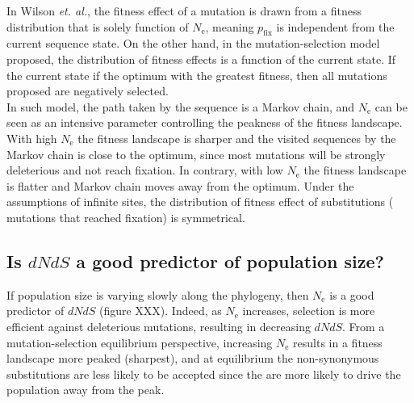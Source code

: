 \documentclass{article}
\newcommand{\e}{\mathrm{e}}
\newcommand{\Ne}{N_\e}
\newcommand{\dnds}{dNdS}
\begin{document}
In Wilson \textit{et. al.}, the fitness effect of a mutation is drawn from a fitness distribution that is solely function of $\Ne$, meaning ${p_{\mathrm{fix}}}$ is independent from the current sequence state.
On the other hand, in the mutation-selection model proposed, the distribution of fitness effects is a function of the current state.
If the current state if the optimum with the greatest fitness, then all mutations proposed are negatively selected.\\

In such model, the path taken by the sequence is a Markov chain, and $\Ne$ can be seen as an intensive parameter controlling the peakness of the fitness landscape. With high $\Ne$ the fitness landscape is sharper and the visited sequences by the Markov chain is close to the optimum, since most mutations will be strongly deleterious and not reach fixation. In contrary, with low $\Ne$ the fitness landscape is flatter and Markov chain moves away from the optimum.
Under the assumptions of infinite sites, the distribution of fitness effect of substitutions ( mutations that reached fixation) is symmetrical.

\begin{figure}[H]
	\centering
	\caption{\textbf{}}
\end{figure}
\subsection{Is $\dnds$ a good predictor of population size?}

If population size is varying slowly along the phylogeny, then $\Ne$ is a good predictor of $\dnds$ (figure XXX).
Indeed, as $\Ne$ increases, selection is more efficient against deleterious mutations, resulting in decreasing $\dnds$.
From a mutation-selection equilibrium perspective, increasing $\Ne$ results in a fitness landscape more peaked (sharpest), and at equilibrium the non-synonymous substitutions are less likely to be accepted since the are more likely to drive the population away from the peak.
\end{document}

